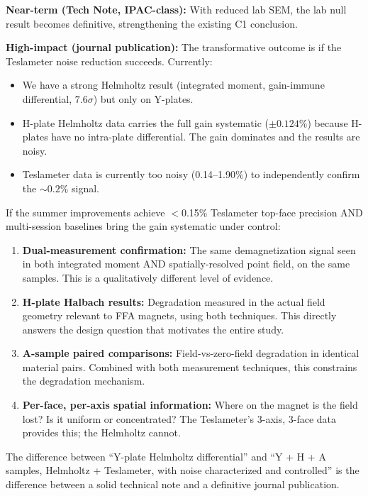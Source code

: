 \documentclass[11pt,letterpaper]{article}
\begin{document}
\textbf{Near-term (Tech Note, IPAC-class):} With reduced lab SEM, the lab null
result becomes definitive, strengthening the existing C1 conclusion.

\textbf{High-impact (journal publication):} The transformative outcome is if the
Teslameter noise reduction succeeds. Currently:

\begin{itemize}[nosep]
  \item We have a strong Helmholtz result (integrated moment, gain-immune
    differential, $7.6\sigma$) but only on Y-plates.
  \item H-plate Helmholtz data carries the full gain systematic ($\pm 0.124\%$)
    because H-plates have no intra-plate differential. The gain dominates and the
    results are noisy.
  \item Teslameter data is currently too noisy (0.14--1.90\%) to independently
    confirm the ${\sim}0.2\%$ signal.
\end{itemize}

If the summer improvements achieve $<$0.15\% Teslameter top-face precision AND
multi-session baselines bring the gain systematic under control:

\begin{enumerate}[nosep]
  \item \textbf{Dual-measurement confirmation:} The same demagnetization signal
    seen in both integrated moment AND spatially-resolved point field, on the
    same samples. This is a qualitatively different level of evidence.
  \item \textbf{H-plate Halbach results:} Degradation measured in the actual
    field geometry relevant to FFA magnets, using both techniques. This directly
    answers the design question that motivates the entire study.
  \item \textbf{A-sample paired comparisons:} Field-vs-zero-field degradation in
    identical material pairs. Combined with both measurement techniques, this
    constrains the degradation mechanism.
  \item \textbf{Per-face, per-axis spatial information:} Where on the magnet is
    the field lost? Is it uniform or concentrated? The Teslameter's 3-axis,
    3-face data provides this; the Helmholtz cannot.
\end{enumerate}

The difference between ``Y-plate Helmholtz differential'' and ``Y + H + A
samples, Helmholtz + Teslameter, with noise characterized and controlled'' is the
difference between a solid technical note and a definitive journal publication.
\end{document}
